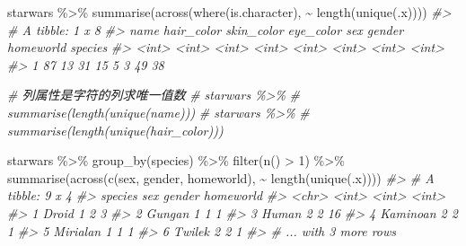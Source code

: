 \documentclass[
]{book}
\newenvironment{Shaded}{\begin{snugshade}}{\end{snugshade}}
\newcommand{\CommentTok}[1]{\textcolor[rgb]{0.56,0.35,0.01}{\textit{#1}}}
\newcommand{\DecValTok}[1]{\textcolor[rgb]{0.00,0.00,0.81}{#1}}
\newcommand{\FunctionTok}[1]{\textcolor[rgb]{0.00,0.00,0.00}{#1}}
\newcommand{\NormalTok}[1]{#1}
\newcommand{\SpecialCharTok}[1]{\textcolor[rgb]{0.00,0.00,0.00}{#1}}
\begin{document}
\begin{Shaded}
\begin{Highlighting}[]
\NormalTok{starwars }\SpecialCharTok{\%\textgreater{}\%} 
  \FunctionTok{summarise}\NormalTok{(}\FunctionTok{across}\NormalTok{(}\FunctionTok{where}\NormalTok{(is.character), }\SpecialCharTok{\textasciitilde{}} \FunctionTok{length}\NormalTok{(}\FunctionTok{unique}\NormalTok{(.x))))}
\CommentTok{\#\textgreater{} \# A tibble: 1 x 8}
\CommentTok{\#\textgreater{}    name hair\_color skin\_color eye\_color   sex gender homeworld species}
\CommentTok{\#\textgreater{}   \textless{}int\textgreater{}      \textless{}int\textgreater{}      \textless{}int\textgreater{}     \textless{}int\textgreater{} \textless{}int\textgreater{}  \textless{}int\textgreater{}     \textless{}int\textgreater{}   \textless{}int\textgreater{}}
\CommentTok{\#\textgreater{} 1    87         13         31        15     5      3        49      38}

\CommentTok{\# 列属性是字符的列求唯一值数}
\CommentTok{\# starwars \%\textgreater{}\% }
\CommentTok{\#   summarise(length(unique(name)))}
\CommentTok{\# starwars \%\textgreater{}\% }
\CommentTok{\#   summarise(length(unique(hair\_color)))}

\NormalTok{starwars }\SpecialCharTok{\%\textgreater{}\%} 
  \FunctionTok{group\_by}\NormalTok{(species) }\SpecialCharTok{\%\textgreater{}\%} 
  \FunctionTok{filter}\NormalTok{(}\FunctionTok{n}\NormalTok{() }\SpecialCharTok{\textgreater{}} \DecValTok{1}\NormalTok{) }\SpecialCharTok{\%\textgreater{}\%} 
  \FunctionTok{summarise}\NormalTok{(}\FunctionTok{across}\NormalTok{(}\FunctionTok{c}\NormalTok{(sex, gender, homeworld), }\SpecialCharTok{\textasciitilde{}} \FunctionTok{length}\NormalTok{(}\FunctionTok{unique}\NormalTok{(.x))))}
\CommentTok{\#\textgreater{} \# A tibble: 9 x 4}
\CommentTok{\#\textgreater{}   species    sex gender homeworld}
\CommentTok{\#\textgreater{}   \textless{}chr\textgreater{}    \textless{}int\textgreater{}  \textless{}int\textgreater{}     \textless{}int\textgreater{}}
\CommentTok{\#\textgreater{} 1 Droid        1      2         3}
\CommentTok{\#\textgreater{} 2 Gungan       1      1         1}
\CommentTok{\#\textgreater{} 3 Human        2      2        16}
\CommentTok{\#\textgreater{} 4 Kaminoan     2      2         1}
\CommentTok{\#\textgreater{} 5 Mirialan     1      1         1}
\CommentTok{\#\textgreater{} 6 Twi\textquotesingle{}lek      2      2         1}
\CommentTok{\#\textgreater{} \# ... with 3 more rows}


\end{Highlighting}
\end{Shaded}
\end{document}
